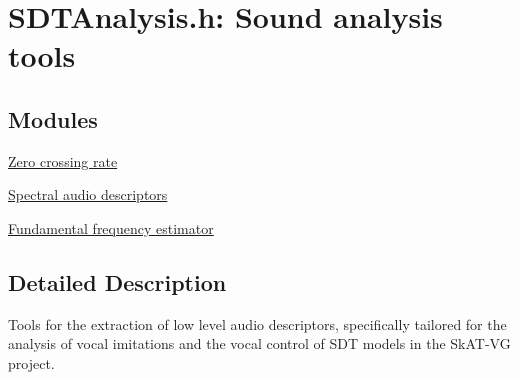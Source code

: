 \hypertarget{group__analysis}{}\section{S\+D\+T\+Analysis.\+h\+: Sound analysis tools}
\label{group__analysis}
\subsection*{Modules}
\begin{DoxyCompactItemize}
\item 
\hyperlink{group__zerocrossing}{Zero crossing rate}
\item 
\hyperlink{group__spectralfeats}{Spectral audio descriptors}
\item 
\hyperlink{group__pitch}{Fundamental frequency estimator}
\end{DoxyCompactItemize}


\subsection{Detailed Description}
Tools for the extraction of low level audio descriptors, specifically tailored for the analysis of vocal imitations and the vocal control of S\+D\+T models in the Sk\+A\+T-\/\+V\+G project. 